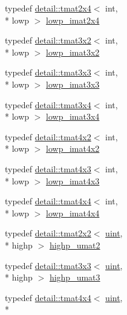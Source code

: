 \begin{DoxyCompactItemize}
typedef \hyperlink{structglm_1_1detail_1_1tmat2x4}{detail\-::tmat2x4}$<$ int, \\*
lowp $>$ \hyperlink{group__gtc__matrix__integer_ga4d859ef48cdfb15b2c9acc98064dd272}{lowp\-\_\-imat2x4}
\item 
typedef \hyperlink{structglm_1_1detail_1_1tmat3x2}{detail\-::tmat3x2}$<$ int, \\*
lowp $>$ \hyperlink{group__gtc__matrix__integer_ga250780f2be05f698b881b04ba7ce0452}{lowp\-\_\-imat3x2}
\item 
typedef \hyperlink{structglm_1_1detail_1_1tmat3x3}{detail\-::tmat3x3}$<$ int, \\*
lowp $>$ \hyperlink{group__gtc__matrix__integer_gae0d6068aaf9b1f8f06c6cc32941f9471}{lowp\-\_\-imat3x3}
\item 
typedef \hyperlink{structglm_1_1detail_1_1tmat3x4}{detail\-::tmat3x4}$<$ int, \\*
lowp $>$ \hyperlink{group__gtc__matrix__integer_gaba7c2c9f782278aaa10dad882d73ef0d}{lowp\-\_\-imat3x4}
\item 
typedef \hyperlink{structglm_1_1detail_1_1tmat4x2}{detail\-::tmat4x2}$<$ int, \\*
lowp $>$ \hyperlink{group__gtc__matrix__integer_ga0d7055814ab969df3b844ba9c52dbf61}{lowp\-\_\-imat4x2}
\item 
typedef \hyperlink{structglm_1_1detail_1_1tmat4x3}{detail\-::tmat4x3}$<$ int, \\*
lowp $>$ \hyperlink{group__gtc__matrix__integer_ga73858cf965b0aa7e72908eb817c192d6}{lowp\-\_\-imat4x3}
\item 
typedef \hyperlink{structglm_1_1detail_1_1tmat4x4}{detail\-::tmat4x4}$<$ int, \\*
lowp $>$ \hyperlink{group__gtc__matrix__integer_ga92339a0b053a721e3b88267e6d175014}{lowp\-\_\-imat4x4}
\item 
typedef \hyperlink{structglm_1_1detail_1_1tmat2x2}{detail\-::tmat2x2}$<$ \hyperlink{group__core__precision_ga4fd29415871152bfb5abd588334147c8}{uint}, \\*
highp $>$ \hyperlink{group__gtc__matrix__integer_ga0c89800e3f63f82da4a4159004811cec}{highp\-\_\-umat2}
\item 
typedef \hyperlink{structglm_1_1detail_1_1tmat3x3}{detail\-::tmat3x3}$<$ \hyperlink{group__core__precision_ga4fd29415871152bfb5abd588334147c8}{uint}, \\*
highp $>$ \hyperlink{group__gtc__matrix__integer_ga2a271939d0123103f088e325e5123385}{highp\-\_\-umat3}
\item 
typedef \hyperlink{structglm_1_1detail_1_1tmat4x4}{detail\-::tmat4x4}$<$ \hyperlink{group__core__precision_ga4fd29415871152bfb5abd588334147c8}{uint}, \\*

\end{DoxyCompactItemize}
